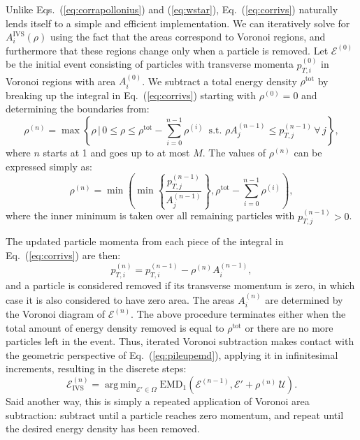 \documentclass[letterpaper,11pt]{article}
\DeclareMathOperator*{\argmin}{arg\,min}
\newcommand{\E}{\mathcal{E}}
\DeclareRobustCommand{\Eq}[1]{Eq.~(\ref{#1})}
\DeclareRobustCommand{\Eqs}[2]{Eqs.~(\ref{#1}) and (\ref{#2})}
\newcommand{\EMD}{\text{EMD}\xspace}
\begin{document}
Unlike \Eqs{eq:corrapollonius}{eq:wstar}, \Eq{eq:corrivs} naturally lends itself to a simple and efficient implementation.
%
We can iteratively solve for $A_i^\text{IVS}(\rho)$ using the fact that the areas correspond to Voronoi regions, and furthermore that these regions change only when a particle is removed.
%
Let $\E^{(0)}$ be the initial event consisting of particles with transverse momenta $p_{T,i}^{(0)}$ in Voronoi regions with area $A_i^{(0)}$.
%
We subtract a total energy density $\rho^\text{tot}$ by breaking up the integral in \Eq{eq:corrivs} starting with $\rho^{(0)}=0$ and determining the boundaries from:
%
\begin{equation}
\label{eq:rhon}
\rho^{(n)}=\max\left\{\rho\,\Bigg|\,0\le\rho\le\rho^\text{tot}-\sum_{i=0}^{n-1}\rho^{(i)}\,\text{ s.t. }\rho A_j^{(n-1)}\le p_{T,j}^{(n-1)}\,\forall\,j\right\},
\end{equation}
where $n$ starts at 1 and goes up to at most $M$.
%
The values of $\rho^{(n)}$ can be expressed simply as:
\begin{equation}
\label{eq:rhon2}
\rho^{(n)}=\min\left(\min\left\{\frac{p_{T,j}^{(n-1)}}{A_j^{(n-1)}}\right\}, \rho^\text{tot} - \sum_{i=0}^{n-1} \rho^{(i)}\right),
\end{equation}
where the inner minimum is taken over all remaining particles with $p_{T,j}^{(n-1)}>0$.


The updated particle momenta from each piece of the integral in \Eq{eq:corrivs} are then:
%
\begin{equation}
p_{T,i}^{(n)}=p_{T,i}^{(n-1)}-\rho^{(n)}A_i^{(n-1)},
\end{equation}
%
and a particle is considered removed if its transverse momentum is zero, in which case it is also considered to have zero area.
%
The areas $A_i^{(n)}$ are determined by the Voronoi diagram of $\E^{(n)}$.
%
The above procedure terminates either when the total amount of energy density removed is equal to $\rho^\text{tot}$ or there are no more particles left in the event.
%
Thus, iterated Voronoi subtraction makes contact with the geometric perspective of \Eq{eq:pileupemd}, applying it in infinitesimal increments, resulting in the discrete steps:
%
\begin{equation}\label{eq:eitvor2}
\boxed{
\mathcal E_\text{IVS}^{(n)} = \argmin_{\mathcal E' \in \Omega} \EMD_1(\mathcal E^{(n-1)}, \mathcal E' + \rho^{(n)}\,\mathcal U).
}
\end{equation}
%
Said another way, this is simply a repeated application of Voronoi area subtraction:  subtract until a particle reaches zero momentum, and repeat until the desired energy density has been removed.
\end{document}
